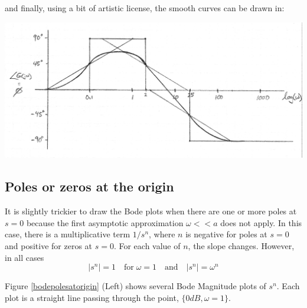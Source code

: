 \begin{Example}
and finally, using a bit of artistic license, the smooth curves can be drawn in:

\includegraphics[width=5.5in]{figs05/00760a.png}


\end{Example}


\subsection{Poles or zeros at the origin}

It is slightly trickier to draw the Bode plots when there are one or more poles at $s=0$ because the first asymptotic approximation $\omega << a$ does not
apply.  In this case, there is a multiplicative term $1/s^n$, where $n$ is negative for poles at $s=0$ and positive for zeros at $s=0$.
For each value of $n$, the slope changes.  However, in all cases
\[
|s^n| = 1 \quad \mathrm{for} \;\omega=1 \quad\mathrm{and}\quad |s^n| = \omega^n
\]

Figure \ref{bodepolesatorigin} (Left) shows several Bode Magnitude plots of $s^n$.  Each plot is a straight line passing through the point, $\{0dB, \omega=1\}$.

